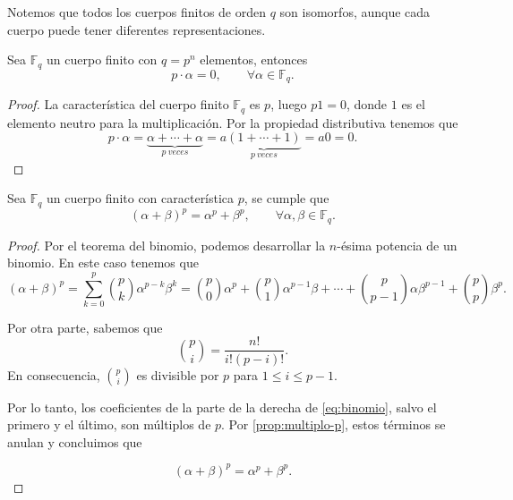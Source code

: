 Notemos que todos los cuerpos finitos de orden $q$ son isomorfos, aunque cada cuerpo puede tener diferentes representaciones.

\begin{proposition}
    \label{prop:multiplo-p}
    Sea $\mathbb{F}_q$ un cuerpo finito con $q = p^n$ elementos, entonces 
    \[
        p \cdot \alpha = 0, \qquad \forall \alpha \in \mathbb{F}_q.
    \]
\end{proposition}

\begin{proof}
    La característica del cuerpo finito $\mathbb{F}_q$ es $p$, luego $p1 = 0$, donde $1$ es el elemento neutro para la multiplicación. Por la propiedad distributiva tenemos que
    \[
        p \cdot \alpha = \underbrace{\alpha + \cdots + \alpha}_{p\ veces} = a \underbrace{(1 + \cdots + 1)}_{p\ veces} = a0 = 0.
    \]
\end{proof}

\begin{proposition}
    Sea $\mathbb{F}_q$ un cuerpo finito con característica $p$, se cumple que
    \[
        ( \alpha + \beta )^p = \alpha^p + \beta^p, \qquad \forall \alpha, \beta \in \mathbb{F}_q.
    \]
\end{proposition}

\begin{proof}
    Por el teorema del binomio, podemos desarrollar la $n$-ésima potencia de un binomio. En este caso tenemos que
    \begin{equation}
        \label{eq:binomio}
        ( \alpha + \beta )^p
            =\sum_{k=0}^p {p \choose k}\alpha^{p-k} \beta^k
            ={p \choose 0}\alpha^p + {p\choose 1} \alpha^{p-1} \beta + \cdots + {p\choose p-1}\alpha \beta^{p-1} + {p \choose p} \beta^p.
    \end{equation}

    Por otra parte, sabemos que
    \[
        {p \choose i} = \frac{n!}{i! (p-i)!}. 
    \]
    En consecuencia, ${p \choose i}$ es divisible por $p$ para $1 \leq i \leq p-1$.

    Por lo tanto, los coeficientes de la parte de la derecha de \eqref{eq:binomio}, salvo el primero y el último, son múltiplos de $p$. Por \ref{prop:multiplo-p}, estos términos se anulan y concluimos que

    \begin{equation*}
        ( \alpha + \beta )^p = \alpha^p + \beta^p.
    \end{equation*}
\end{proof}

